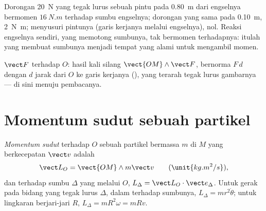 \begin{example}[Pintunya]\label{ex:b1:angular-momentum:door}
Dorongan \qty{20}{N} yang tegak lurus sebuah pintu pada \qty{0.80}{m}
dari engselnya bermomen $\qty{16}{N.m}$ terhadap sumbu engselnya;
dorongan yang sama pada \qty{0.10}{m}, \qty{2}{N.m}; menyusuri pintunya
(garis kerjanya melalui engselnya), nol. Reaksi engselnya sendiri, yang
memotong sumbunya, tak bermomen terhadapnya: itulah yang membuat
sumbunya menjadi tempat yang alami untuk mengambil momen.
\end{example}

\begin{omfigure}

{\small {} $\vect F$ terhadap $O$: hasil kali silang
$\vect{OM}\wedge\vect F$, bernorma $F\,d$ dengan $d$ jarak dari $O$ ke
garis kerjanya (), yang terarah tegak lurus gambarnya ---
di sini menuju pembacanya.}
\end{omfigure}

\section{Momentum sudut sebuah partikel}

\begin{definition}\label{def:b1:angular-momentum:L}
\emph{Momentum sudut} terhadap $O$ sebuah partikel bermassa $m$ di $M$
yang berkecepatan $\vect v$ adalah
\[
\vect L_O = \vect{OM}\wedge m\vect v \qquad (\unit{kg.m^2/s}),
\]
dan terhadap sumbu $\Delta$ yang melalui $O$, $L_\Delta = \vect L_O\cdot\vect e_\Delta$.
Untuk gerak pada bidang yang tegak lurus $\Delta$, dalam 
terhadap sumbunya, $L_\Delta = mr^2\dot\theta$; untuk lingkaran
berjari-jari $R$, $L_\Delta = mR^2\omega = mRv$.
\end{definition}

